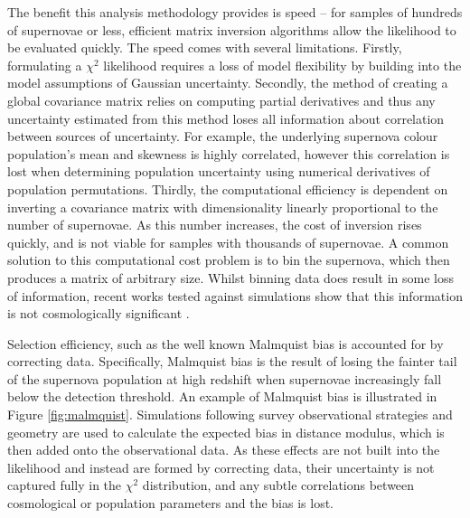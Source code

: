 \documentclass[a4paper,fleqn,usenatbib]{mnras}
\newcommand{\green}{\color{forestgreen}}
\begin{document}
The benefit this analysis methodology provides is speed -- for samples of hundreds of supernovae or less, efficient matrix inversion algorithms allow the likelihood to be evaluated quickly. The speed comes with several limitations. Firstly, formulating a $\chi^2$ likelihood requires a loss of model flexibility by building into the model assumptions of Gaussian uncertainty. Secondly, the method of creating a global covariance matrix relies on computing partial derivatives and thus any uncertainty estimated from this method loses all information about correlation between sources of uncertainty. For example, the underlying supernova colour population's mean and skewness is highly correlated, however this correlation is lost when determining population uncertainty using numerical derivatives of population permutations. Thirdly, the computational efficiency is dependent on inverting a covariance matrix with dimensionality linearly proportional to the number of supernovae. As this number increases, the cost of inversion rises quickly, and is not viable for samples with thousands of supernovae. {\green A common solution to this computational cost problem is to bin the supernova, which then produces a matrix of arbitrary size. Whilst binning data does result in some loss of information, recent works tested against simulations show that this information is not cosmologically significant \citep{Scolnic2016, Kessler2017}.}

Selection efficiency, such as the well known Malmquist bias \citep{MalmquistK.G.1922} is accounted for by correcting data. Specifically, Malmquist bias is the result of losing the fainter tail of the supernova population at high redshift when supernovae increasingly fall below the detection threshold. An example of Malmquist bias is illustrated in Figure \ref{fig:malmquist}. Simulations following survey observational strategies and geometry are used to calculate the expected bias in distance modulus, which is then added onto the observational data. As these effects are not built into the likelihood and instead are formed by correcting data, their uncertainty is not captured fully in the $\chi^2$ distribution, and any subtle correlations between cosmological or population parameters and the bias is lost.
\end{document}
